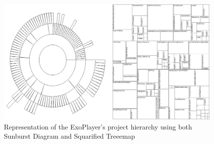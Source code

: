 \begin{figure}[H]
  \centering
  \includegraphics[width=1\textwidth]{figures/sun_tree_comp.png}
  \caption{Representation of the ExoPlayer's project hierarchy using both Sunburst Diagram and Squarified Treeemap}
  \label{fig:sun_tree_comp}
\end{figure}
